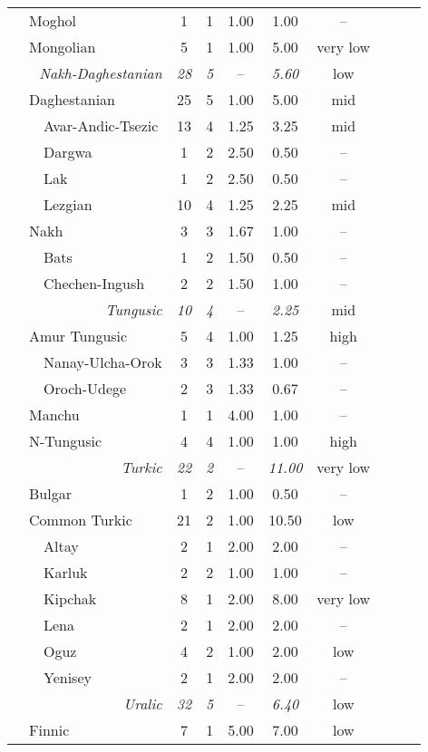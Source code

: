 \begin{footnotesize}
\begin{longtable}[h]{l l l || c || c | c | c || c c c | c}
&\multicolumn{2}{l||}{Moghol}		&1		&1		&1.00	&1.00	&–\\
&\multicolumn{2}{l||}{Mongolian}	&5		&1		&1.00	&5.00	&very low\\
\hline
\multicolumn{3}{r||}{\textit{Nakh-Daghestanian}}&\textit{28}&\textit{5}&–&\textit{5.60}&low\\
&\multicolumn{2}{l||}{Daghestanian}	&25	&5	&1.00	&5.00			&mid\\
&&Avar-Andic-Tsezic			&13	&4	&1.25	&3.25			&mid\\
&&Dargwa					&1	&2	&2.50	&0.50			&–\\
&&Lak						&1	&2	&2.50	&0.50			&–\\
&&Lezgian					&10	&4	&1.25	&2.25			&mid\\
&\multicolumn{2}{l||}{Nakh}		&3	&3	&1.67	&1.00			&–\\
&&Bats						&1	&2	&1.50	&0.50			&–\\
&&Chechen-Ingush				&2	&2	&1.50	&1.00			&–\\
\hline
\multicolumn{3}{r||}{\textit{Tungusic}}&\textit{10}&\textit{4}&–&\textit{2.25}		&mid\\
&\multicolumn{2}{l||}{Amur Tungusic}	&5	&4	&1.00	&1.25			&high\\
&&Nanay-Ulcha-Orok			&3	&3	&1.33	&1.00			&–\\
&&Oroch-Udege				&2	&3	&1.33	&0.67			&–\\
&\multicolumn{2}{l||}{Manchu}		&1	&1	&4.00	&1.00			&–\\
&\multicolumn{2}{l||}{N-Tungusic}	&4	&4	&1.00	&1.00			&high\\
\hline
\multicolumn{3}{r||}{\textit{Turkic}}&\textit{22}&\textit{2}&–&\textit{11.00}		&very low\\
&\multicolumn{2}{l||}{Bulgar}		&1 	&2	&1.00	&0.50			&–\\
&\multicolumn{2}{l||}{Common Turkic}&21 	&2	&1.00	&10.50			&low\\
&&Altay						&2	&1	&2.00	&2.00			&–\\
&&Karluk						&2	&2	&1.00	&1.00			&–\\
&&Kipchak					&8	&1	&2.00	&8.00			&very low\\
&&Lena						&2	&1	&2.00	&2.00			&–\\
&&Oguz						&4	&2	&1.00	&2.00			&low\\
&&Yenisey					&2	&1	&2.00	&2.00			&–\\
\hline
\multicolumn{3}{r||}{\textit{Uralic}}	&\textit{32}&\textit{5}&–&\textit{6.40}		&low\\
&\multicolumn{2}{l||}{Finnic}		&7	&1	&5.00	&7.00			&low\\

\end{longtable}
\end{footnotesize}
